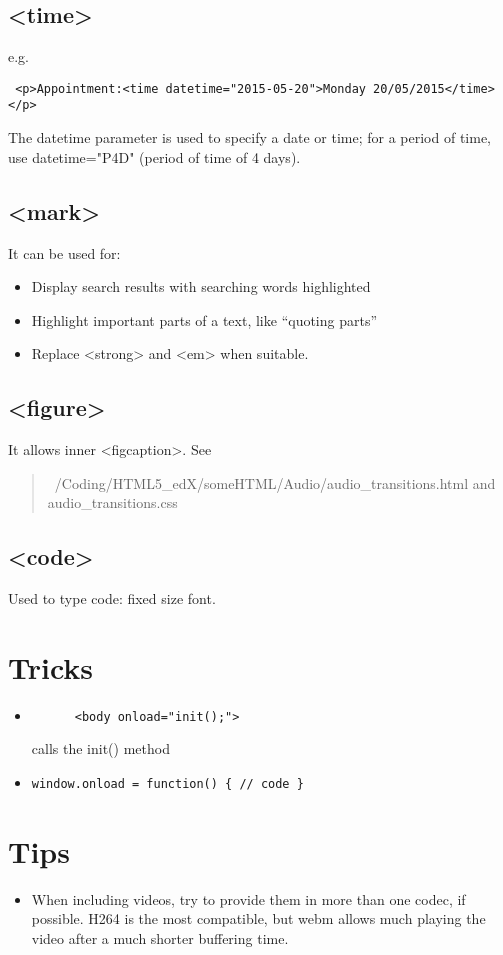 \documentclass[a4paper,11pt]{book}
\begin{document}
    \section{<time>}
    e.g.
    \begin{verbatim} <p>Appointment:<time datetime="2015-05-20">Monday 20/05/2015</time></p> \end{verbatim}
    The datetime parameter is used to specify a date or time; for a period of time, use datetime="P4D"
    (period of time of 4 days).
    \section{<mark>}
    It can be used for:
    \begin{itemize}
        \item Display search results with searching words highlighted
        \item Highlight important parts of a text, like ``quoting parts''
        \item Replace <strong> and <em> when suitable.
    \end{itemize}

    \section{<figure>}
    It allows inner <figcaption>. See
    \begin{verse}
~/Coding/HTML5\_edX/someHTML/Audio/audio\_transitions.html and audio\_transitions.css
	\end{verse}

	\section{<code>}
	Used to type code: fixed size font.

\chapter{Tricks}
\begin{itemize}
\item \begin{verbatim}
	  <body onload="init();">
	  \end{verbatim}	
	  calls the init() method
\item \texttt{window.onload = function() \{ // code \}}
\end{itemize}

\chapter{Tips}
\begin{itemize}
\item When including videos, try to provide them in more than one codec, if possible. H264 is the most compatible,
	but webm allows much playing the video after a much shorter buffering time.
\end{itemize}
\end{document}

